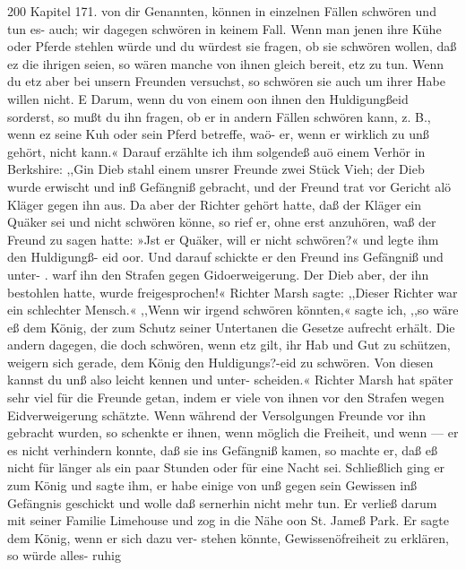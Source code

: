 200 Kapitel 171.
von dir Genannten, können in einzelnen Fällen schwören und tun
es- auch; wir dagegen schwören in keinem Fall. Wenn man jenen
ihre Kühe oder Pferde stehlen würde und du würdest sie fragen,
ob sie schwören wollen, daß ez die ihrigen seien, so wären manche
von ihnen gleich bereit, etz zu tun. Wenn du etz aber bei unsern
Freunden versuchst, so schwören sie auch um ihrer Habe willen
nicht. E Darum, wenn du von einem oon ihnen den Huldigungßeid
sorderst, so mußt du ihn fragen, ob er in andern Fällen schwören
kann, z. B., wenn ez seine Kuh oder sein Pferd betreffe, waö- er,
wenn er wirklich zu unß gehört, nicht kann.« Darauf erzählte
ich ihm solgendeß auö einem Verhör in Berkshire: ,,Gin Dieb stahl
einem unsrer Freunde zwei Stück Vieh; der Dieb wurde erwischt
und inß Gefängniß gebracht, und der Freund trat vor Gericht
alö Kläger gegen ihn aus. Da aber der Richter gehört hatte,
daß der Kläger ein Quäker sei und nicht schwören könne, so rief
er, ohne erst anzuhören, waß der Freund zu sagen hatte: »Jst
er Quäker, will er nicht schwören?« und legte ihm den Huldigungß-
eid oor. Und darauf schickte er den Freund ins Gefängniß und unter- .
warf ihn den Strafen gegen Gidoerweigerung. Der Dieb aber, der
ihn bestohlen hatte, wurde freigesprochen!« Richter Marsh sagte:
,,Dieser Richter war ein schlechter Mensch.« ,,Wenn wir irgend
schwören könnten,« sagte ich, ,,so wäre eß dem König, der zum
Schutz seiner Untertanen die Gesetze aufrecht erhält. Die andern
dagegen, die doch schwören, wenn etz gilt, ihr Hab und Gut zu
schützen, weigern sich gerade, dem König den Huldigungs?-eid zu
schwören. Von diesen kannst du unß also leicht kennen und unter-
scheiden.«
Richter Marsh hat später sehr viel für die Freunde getan,
indem er viele von ihnen vor den Strafen wegen Eidverweigerung
schätzte. Wenn während der Versolgungen Freunde vor ihn gebracht
wurden, so schenkte er ihnen, wenn möglich die Freiheit, und wenn —
er es nicht verhindern konnte, daß sie ins Gefängniß kamen, so
machte er, daß eß nicht für länger als ein paar Stunden oder
für eine Nacht sei. Schließlich ging er zum König und sagte
ihm, er habe einige von unß gegen sein Gewissen inß Gefängnis
geschickt und wolle daß sernerhin nicht mehr tun. Er verließ
darum mit seiner Familie Limehouse und zog in die Nähe oon
St. Jameß Park. Er sagte dem König, wenn er sich dazu ver-
stehen könnte, Gewissenöfreiheit zu erklären, so würde alles- ruhig


